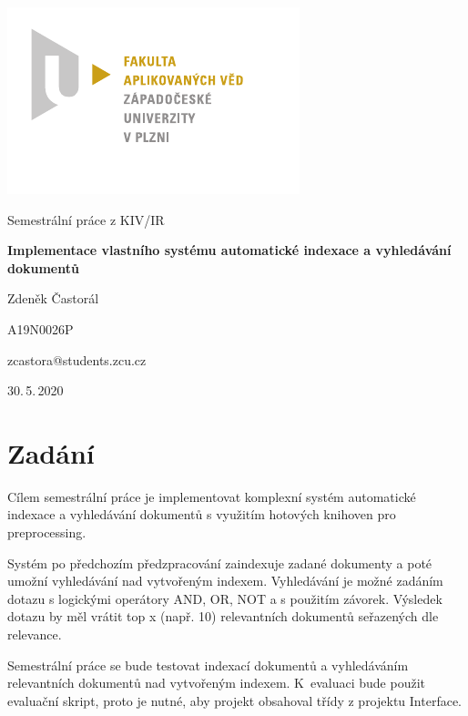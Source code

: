 \documentclass[
11pt,
a4paper,
pdftex,
czech,
titlepage
]{report}
\begin{document}
\begin{titlepage}
	{\centering\includegraphics[scale=1.2]{img/logo-FAV.pdf}\par}
	\centering
	\vspace*{2.5cm}
	{\Large Semestrální práce z KIV/IR\par}
	\vspace{1.5cm}
	{\Huge\bfseries Implementace vlastního systému automatické indexace a vyhledávání dokumentů\par}
	\vspace{2.5cm}

	{\Large Zdeněk Častorál\par}
	{\Large A19N0026P\par}
	{\Large zcastora@students.zcu.cz\par}

	\vfill

	{\Large 30.\,5.\,2020}
\end{titlepage}

\tableofcontents
\thispagestyle{empty}
\clearpage

\newpage
\chapter{Zadání}\label{zadani}
\setcounter{page}{3}
Cílem semestrální práce je implementovat komplexní systém automatické indexace a vyhledávání dokumentů s využitím hotových knihoven pro preprocessing.

Systém po předchozím předzpracování zaindexuje zadané dokumenty a poté umožní vyhledávání nad vytvořeným indexem. Vyhledávání je možné zadáním dotazu s logickými operátory AND, OR, NOT a s použitím závorek. Výsledek dotazu by měl vrátit top x (např. 10) relevantních dokumentů seřazených dle relevance.

Semestrální práce se bude testovat indexací dokumentů a vyhledáváním relevantních dokumentů nad vytvořeným indexem. K~evaluaci bude použit evaluační skript, proto je nutné, aby projekt obsahoval třídy z projektu Interface.
\end{document}
